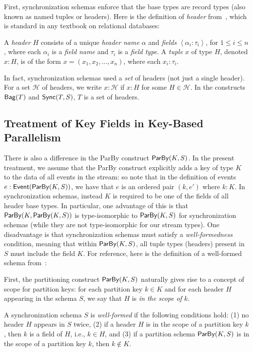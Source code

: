 First, synchronization schemas enforce that the base types are record types (also known as named tuples or headers).
Here is the definition of \emph{header} from~,
which is standard in any textbook on relational databases:
\begin{definition}
A \emph{header} $H$
consists of a unique \emph{header name} \(\alpha\)
and \emph{fields} \(\left\langle \alpha_i: \tau_i \right\rangle\), for $1\le i\le n$,
where each \(\alpha_i\) is a \emph{field name}
and \(\tau_i\) is a \emph{field type}.
A \emph{tuple} $x$ of type \(H\), denoted $x : H$, is of the form
\(x = (x_1, x_2, \ldots, x_n)\), where each \(x_i : \tau_i\).
\end{definition}

In fact, synchronization schemas used a \emph{set} of headers (not just a single header).
For a set $\mathcal{H}$ of headers, we write
$x: \mathcal{H}$ if $x : H$ for some $H \in \mathcal{H}$.
In the constructs $\mathsf{Bag}({T})$ and $\mathsf{Sync}({T}, S)$,
$T$ is a set of headers.

\subsection{Treatment of Key Fields in Key-Based Parallelism}

There is also a difference in the ParBy construct $\mathsf{ParBy}({K}, S)$.
In the present treatment, we assume that the ParBy construct explicitly adds a key of type $K$ to the data of all events in the stream: so note that in the definition of events $e: \mathsf{Event}({\mathsf{ParBy}({K}, S)})$, we have that $e$ is an ordered pair $(k, e')$
where $k: K$.
In synchronization schemas, instead $K$ is required to be one of the fields of all header base types.
In particular, one advantage of this is that $\mathsf{ParBy}({K}, \mathsf{ParBy}({K}, S))$ is type-isomorphic to $\mathsf{ParBy}({K}, S)$ for synchronization schemas (while they are not type-isomorphic for our stream types).
One disadvantage is that synchronization schemas must satisfy a \emph{well-formedness} condition, meaning that within $\mathsf{ParBy}({K}, S)$, all tuple types (headers) present in $S$ must include the field $K$.
For reference, here is the definition of a well-formed schema from~:

\begin{definition}
\label{45:def:well-formed-sync-schema}
First, the partitioning construct $\mathsf{ParBy}({K}, S)$ naturally gives rise to a concept of
scope for partition keys: for each partition key $k \in K$ and for each
header $H$ appearing in the schema $S$,
we say that $H$ is \emph{in the scope of} $k$.

A synchronization schema $S$ is \emph{well-formed} if the following conditions hold: (1) no header $H$ appears in $S$ twice,
    (2) if a header $H$ is in the scope of a partition key $k$, then $k$ is a field of $H$, i.e., $k \in H$, and
    (3) if a partition schema $\mathsf{ParBy}({K}, S)$ is in the scope of a partition key $k$, then $k \not \in K$.
\end{definition}

